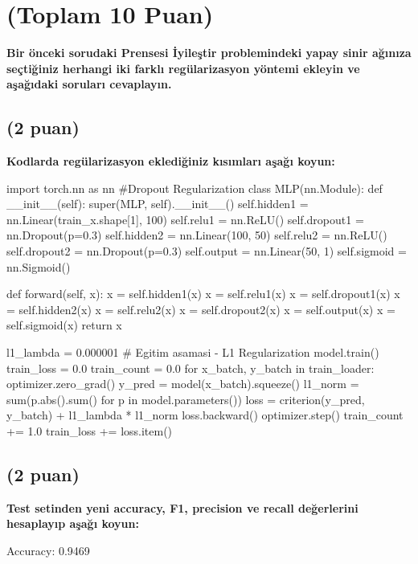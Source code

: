 \documentclass[11pt]{article}
\begin{document}
\section{(Toplam 10 Puan)} \textbf{Bir önceki sorudaki Prensesi İyileştir problemindeki yapay sinir ağınıza seçtiğiniz herhangi iki farklı regülarizasyon yöntemi ekleyin ve aşağıdaki soruları cevaplayın.} 

\subsection{(2 puan)} \textbf{Kodlarda regülarizasyon eklediğiniz kısımları aşağı koyun:} 

\begin{python}
import torch.nn as nn
#Dropout Regularization
class MLP(nn.Module):
    def __init__(self):
        super(MLP, self).__init__()
        self.hidden1 = nn.Linear(train_x.shape[1], 100)
        self.relu1 = nn.ReLU()
        self.dropout1 = nn.Dropout(p=0.3)
        self.hidden2 = nn.Linear(100, 50)
        self.relu2 = nn.ReLU()
        self.dropout2 = nn.Dropout(p=0.3)
        self.output = nn.Linear(50, 1)
        self.sigmoid = nn.Sigmoid()

    def forward(self, x):
        x = self.hidden1(x)
        x = self.relu1(x)
        x = self.dropout1(x)
        x = self.hidden2(x)
        x = self.relu2(x)
        x = self.dropout2(x)
        x = self.output(x)
        x = self.sigmoid(x)
        return x
\end{python}

\begin{python}
l1_lambda = 0.000001
# Egitim asamasi - L1 Regularization
    model.train()
    train_loss = 0.0
    train_count = 0.0
    for x_batch, y_batch in train_loader:
        optimizer.zero_grad()
        y_pred = model(x_batch).squeeze()
        l1_norm = sum(p.abs().sum() for p in model.parameters())
        loss = criterion(y_pred, y_batch) + l1_lambda * l1_norm
        loss.backward()
        optimizer.step()
        train_count += 1.0
        train_loss += loss.item()
\end{python}

\subsection{(2 puan)} \textbf{Test setinden yeni accuracy, F1, precision ve recall değerlerini hesaplayıp aşağı koyun:}

Accuracy: 0.9469
\end{document}
